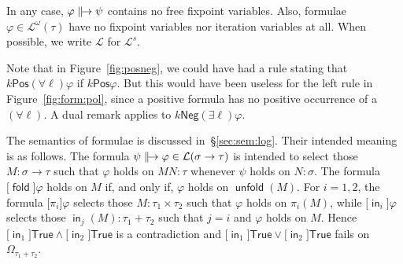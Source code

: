 \documentclass[%
  a4paper,
  UKenglish,
  cleveref,
  autoref,
  thm-restate,
  numberwithinsect,
]{lipics-v2021}
\newcommand\deq\coloneqq
\newcommand\pair[1]{{\langle #1\rangle}}
\newcommand\temp[1]{\mathsf{#1}}
\newcommand\True{\temp{True}}
\newcommand\term[1]{\mathsf{#1}}
\newcommand\inj{\mathop{\term{in}}}
\newcommand\fold{\mathop{\term{fold}}}
\newcommand\unfold{\mathop{\term{unfold}}}
\newcommand\arrow\to
\newcommand\defrealto{\mathrel\parallel\joinrel\to}
\newcommand\realto{\mathrel{\defrealto}}
\newcommand\PT{\tau}		%
\newcommand\PTbis{\sigma}	%
\newcommand\itvar{k}
\newcommand\itvarbis{\ell}
\newcommand\Pos{\mathrel{\term{Pos}}}
\newcommand\Neg{\mathrel{\term{Neg}}}
\newcommand\Lang{\mathcal{L}}
\newcommand\form[1]{\lbrack #1 \rbrack}
\newcommand\sign{s}
\begin{document}
\noindent
In any case, %
$\varphi \realto \psi$
contains no free fixpoint variables.
%
Also, formulae $\varphi \in \Lang^{\omega}(\PT)$
have no fixpoint variables nor iteration variables at all.
%
When possible, we write $\Lang$ for $\Lang^\sign$.

Note that in Figure~\ref{fig:posneg}, we could have had a rule stating
that $\itvar \Pos (\forall \itvarbis)\varphi$ if $\itvar \Pos \varphi$.
But this would have been useless for the left rule in Figure~\ref{fig:form:pol},
since a positive formula has no positive occurrence of a $(\forall \itvarbis)$.
A dual remark applies to $\itvar \Neg (\exists \itvarbis)\varphi$.



The semantics of formulae is discussed in~\S\ref{sec:sem:log}.
Their intended meaning is as follows.
The formula $\psi \realto \varphi \in \Lang(\PTbis \arrow \PT)$
is intended to select those $M \colon \PTbis \arrow \PT$
such that $\varphi$ holds on $M N \colon \PT$ whenever $\psi$ holds on $N \colon \PTbis$.
%
The formula $\form\fold \varphi$ holds on $M$ if, and only if,
$\varphi$ holds on $\unfold(M)$.
%
For $i = 1,2$,
the formula $\form{\pi_i} \varphi$
selects those $M \colon \PT_1 \times \PT_2$
such that $\varphi$ holds on $\pi_i(M)$,
%
while $\form{\inj_i} \varphi$ selects those
$\inj_j(M) \colon \PT_1 + \PT_2$ such that $j = i$ and
$\varphi$ holds on $M$.
Hence
$\form{\inj_1}\True \land \form{\inj_2}\True$ is a contradiction
and
$\form{\inj_1}\True \lor \form{\inj_2}\True$ fails on $\Omega_{\PT_1 + \PT_2}$.




\end{document}
